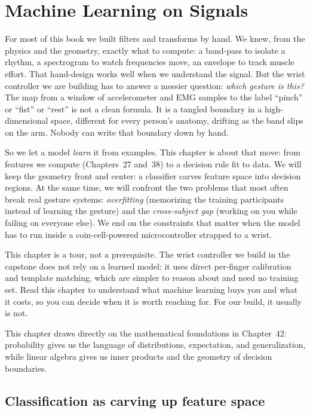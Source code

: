 \chapter{Machine Learning on Signals}

For most of this book we built filters and transforms by hand. We knew, from the
physics and the geometry, exactly what to compute: a band-pass to isolate a rhythm, a
spectrogram to watch frequencies move, an envelope to track muscle effort. That
hand-design works well when we understand the signal. But the wrist controller
we are building has to answer a messier question: \emph{which gesture is this?} The map
from a window of accelerometer and EMG samples to the label ``pinch'' or ``fist'' or
``rest'' is not a clean formula. It is a tangled boundary in a high-dimensional space,
different for every person's anatomy, drifting as the band slips on the arm. Nobody can
write that boundary down by hand.

So we let a model \emph{learn} it from examples. This chapter is about that move: from
features we compute (Chapters~27 and~38) to a decision rule fit to data.
We will keep the geometry front and center: a classifier carves
feature space into decision regions. At the same time, we will confront the two problems
that most often break real gesture systems: \emph{overfitting} (memorizing the training
participants instead of learning the gesture) and the \emph{cross-subject gap} (working
on you while failing on everyone else). We end on the constraints that matter when the
model has to run inside a coin-cell-powered microcontroller strapped to a wrist.

This chapter is a tour, not a prerequisite. The wrist controller we build in the capstone
does not rely on a learned model: it uses direct per-finger calibration and template
matching, which are simpler to reason about and need no training set. Read this chapter to
understand what machine learning buys you and what it costs, so you can decide when it is
worth reaching for. For our build, it usually is not.

This chapter draws directly on the mathematical foundations in Chapter~42: probability gives us the language of
distributions, expectation, and generalization, while linear algebra gives us inner products
and the geometry of decision boundaries.

\section{Classification as carving up feature space}
\label{ch39:carving}

